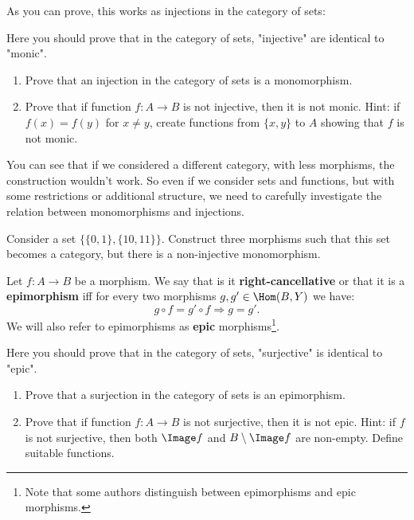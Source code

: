 As you can prove, this works as injections in the category of sets:
\begin{exercise}
  Here you should prove that in the category of sets, "injective" are identical to "monic".
  \begin{enumerate}
    \item Prove that an injection in the category of sets is a monomorphism.
    \item Prove that if function $f: A\to B$ is not injective, then it is not monic. Hint: if $f(x)=f(y)$ for $x\neq y$, create functions from $\{x,y\}$ to $A$ showing that $f$ is not monic.
  \end{enumerate}
\end{exercise}

You can see that if we considered a different category, with less morphisms, the construction wouldn't work. So even if we consider sets and functions, but with some restrictions or additional structure, we need to carefully investigate the relation between monomorphisms and injections.

\begin{exercise}
  Consider a set $\{\{0,1\}, \{10,11\}\}$. Construct three morphisms such that this set becomes a category, but there is a non-injective monomorphism.
\end{exercise}

\begin{definition}
  Let $f: A\to B$ be a morphism. We say that is it \textbf{right-cancellative} or that it is a \textbf{epimorphism} iff for every two morphisms $g,g' \in \Hom(B,Y)$ we have:
  $$g\circ f = g'\circ f\Rightarrow g=g'.$$
  We will also refer to epimorphisms as \textbf{epic} morphisms\footnote{Note that some authors distinguish between epimorphisms and epic morphisms.}.
\end{definition}

\begin{exercise}
  Here you should prove that in the category of sets, "surjective" is identical to "epic".
  \begin{enumerate}
    \item Prove that a surjection in the category of sets is an epimorphism.
    \item Prove that if function $f: A\to B$ is not surjective, then it is not epic. Hint: if $f$ is not surjective, then both $\Image f$ and $B\setminus \Image f$ are non-empty. Define suitable functions.
  \end{enumerate}
\end{exercise}


